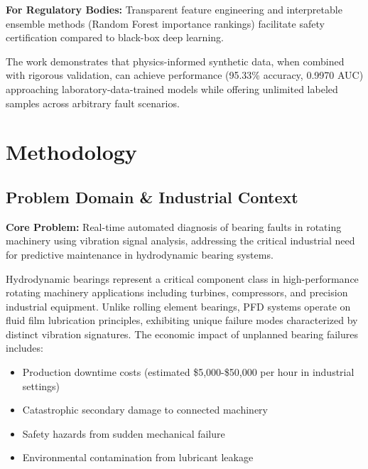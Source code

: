 \documentclass[11pt,a4paper]{article}
\begin{document}
\textbf{For Regulatory Bodies:} Transparent feature engineering and interpretable ensemble methods (Random Forest importance rankings) facilitate safety certification compared to black-box deep learning.

The work demonstrates that physics-informed synthetic data, when combined with rigorous validation, can achieve performance (95.33\% accuracy, 0.9970 AUC) approaching laboratory-data-trained models while offering unlimited labeled samples across arbitrary fault scenarios.

\section{Methodology}

\subsection{Problem Domain \& Industrial Context}

\begin{keypoint}
\textbf{Core Problem:} Real-time automated diagnosis of bearing faults in rotating machinery using vibration signal analysis, addressing the critical industrial need for predictive maintenance in hydrodynamic bearing systems.
\end{keypoint}

Hydrodynamic bearings represent a critical component class in high-performance rotating machinery applications including turbines, compressors, and precision industrial equipment. Unlike rolling element bearings, PFD systems operate on fluid film lubrication principles, exhibiting unique failure modes characterized by distinct vibration signatures. The economic impact of unplanned bearing failures includes:

\begin{itemize}[leftmargin=*, itemsep=0.3em]
    \item Production downtime costs (estimated \$5,000-\$50,000 per hour in industrial settings)
    \item Catastrophic secondary damage to connected machinery
    \item Safety hazards from sudden mechanical failure
    \item Environmental contamination from lubricant leakage
\end{itemize}
\end{document}
